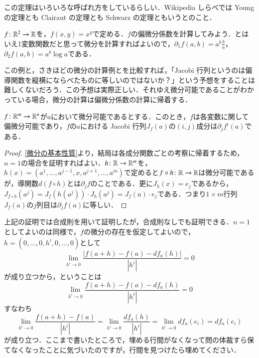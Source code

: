 \begin{dig}
この定理はいろいろな呼ばれ方をしているらしい．Wikipedia しらべでは Young の定理とも Clairaut の定理とも Schwarz の定理ともいうとのこと．
\end{dig}

\begin{exm}
$f \colon \mathbb{R}^2 \to \mathbb{R}$を，$f(x,y) = x^y$で定める．$f$の偏微分係数を計算してみよう．とはいえ1変数関数だと思って微分を計算すればよいので，$\partial_1 f (a,b) = a^b \frac{b}{a}$，$\partial_2 f (a,b) = a^b \log a$である．
\end{exm}

この例と，さきほどの微分の計算例とを比較すれば，「Jacobi 行列というのは偏導関数を縦横にならべたものに等しいのではないか？」という予想をすることは難しくないだろう．この予想は実際正しい．それゆえ微分可能であることがわかっている場合，微分の計算は偏微分係数の計算に帰着する．

\begin{thm}\label{微分可能なら偏微分可能}
$f \colon \mathbb{R}^m \to \mathbb{R}^n$が$a$において微分可能であるとする．このとき，$f$は各変数に関して偏微分可能であり，$f$の$a$における Jacobi 行列$J_f(a)$の$(i,j)$成分は$\partial_jf^i(a)$である．
\end{thm}

\begin{proof}
\cref{微分の基本性質}より，結局は各成分関数ごとの考察に帰着するため，$n=1$の場合を証明すればよい．$h \colon \mathbb{R} \to \mathbb{R}^m$を，$h(x) = (a^1 , \dots, a^{j-1}, x, a^{j+1}, \dots, a^m)$で定めると$f \circ h \colon \mathbb{R} \to \mathbb{R}$は微分可能であるが，導関数$d(f \circ h)$とは$\partial_j f$のことである．更に$J_h(x) = e_j$であるから，$J_{f \circ h} \left(a^j\right)= J_f \left(h\left(a^j\right)\right) \cdot J_h\left(a^j\right) =  J_f \left(a\right) \cdot e_j$である．つまり$1 \times m$行列$J_f \left(a\right)$の$j$列目は$\partial_j f(a)$に等しい．
\end{proof}

\begin{que}
上記の証明では合成則を用いて証明したが，合成則なしでも証明できる．$n=1$としてよいのは同様で，$f$の微分の存在を仮定してよいので，$h = (0, \dots,0, h^i, 0, \dots, 0)$として
\begin{equation}
\lim_{h^i \to 0} \frac{\left| f(a+h) - f(a) -df_a(h) \right|}{\left|h^i\right|} = 0
\end{equation}が成り立つから，ということは
\begin{equation}
\lim_{h^i \to 0} \frac{f(a+h) - f(a) -df_a(h)}{\left|h^i\right|} = 0
\end{equation}すなわち
\begin{equation}
\lim_{h^i \to 0} \frac{f(a+h) - f(a)}{\left|h^i\right|} =  \lim_{h^i \to 0} \frac{df_a(h)}{\left|h^i\right|} = \lim_{h^i \to 0} df_a(e_i) = df_a(e_i)
\end{equation}が成り立つ．ここまで書いたところで，埋める行間がなくなって問の体裁すら保てなくなったことに気づいたのですが，行間を見つけたら埋めてください．
\end{que}

